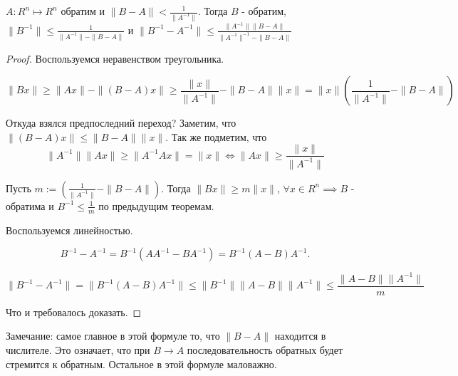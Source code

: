 \begin{theorem} \thmslashn
	
	$A: R^n \mapsto R^n$ обратим и $\|B - A\| < \frac{1}{\|A^{-1}\|}$. Тогда $B$ - обратим, $\|B^{-1}\| \le \frac{1}{\|A^{-1}\| - \|B - A\|}$ и $\|B^{-1} - A^{-1}\| \le \frac{\|A^{-1}\| \|B - A\|}{\|A^{-1}\|^{-1} - \|B - A\| }$
	\begin{proof} \thmslashn
		
		 Воспользуемся неравенством треугольника.
		
		\[
		\|Bx\|
		\ge
		\|Ax\| - \|(B - A)x\|
		\ge
		\frac{\|x\|}{\|A^{-1}\|} - \|B - A\|\|x\|
		=
		\|x\|(\frac{1}{\|A^{-1}\|} - \|B - A\|)
		\]
		
		Откуда взялся предпоследний переход? Заметим, что $\|(B - A)x\| \le \|B  - A\| \|x\|$. Так же подметим, что 
		\[
		\|A^{-1}\| \|Ax\| \ge \|A^{-1}Ax\|
		=
		\|x\| 
		\iff
		\|Ax\|
		\ge 
		\frac{\|x\|}{\|A^{-1}\|}
		\]
		
		Пусть $m:= (\frac{1}{\|A^{-1}\|} - \|B - A\|)$. Тогда $ \|Bx\| \ge m\|x\|$, $\forall x \in R^n \implies B$ - обратима и $B^{-1} \le \frac{1}{m}$ по предыдущим теоремам. 
		
		Воспользуемся линейностью.
		
		\[
		B^{-1} - A^{-1}
		=
		B^{-1}(AA^{-1} - BA^{-1})
		=
		B^{-1}(A - B)A^{-1}.
		\]
		
		\[
		\|B^{-1} - A^{-1}\| 
		=
		\|B^{-1}(A-B)A^{-1}\|
		\le
		\|B^{-1}\|\|A - B\|\|A^{-1}\|
		\le
		\frac{\|A - B\|\|A^{-1}\|}{m}
		\]
		
		Что и требовалось доказать.
	\end{proof}
\end{theorem}

\begin{remark} \thmslashn
	
	Замечание: самое главное в этой формуле то, что $\|B - A\|$ находится в числителе. Это означает, что при $B \to A$ последовательность обратных будет стремится к обратным. Остальное в этой формуле маловажно.
\end{remark}
